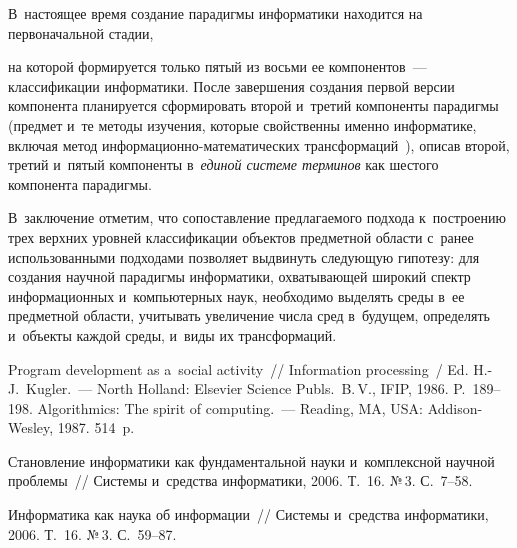 \begin{multicols}{2}
  В~настоящее время создание парадигмы информатики находится на 
первоначальной стадии,\linebreak\vspace*{-12pt}

\pagebreak

\noindent
 на которой формируется только пятый из восьми ее 
компонентов~--- классификации информатики. После завершения создания 
первой версии компонента планируется сформировать второй и~третий 
компоненты парадигмы (предмет и~те методы изучения, которые свойственны 
именно информатике, включая метод  
ин\-фор\-ма\-ци\-он\-но-ма\-те\-ма\-ти\-че\-ских трансформаций~\cite{32-zac}), 
описав второй, третий и~пятый компоненты в~\textit{единой системе 
терминов} как шестого компонента парадигмы.
  
  
  В~заключение отметим, что сопоставление предлагаемого подхода 
к~построению трех верхних уровней классификации объектов предметной 
области с~ранее использованными подходами позволяет выдвинуть  
сле\-ду\-ющую гипотезу: для создания научной парадигмы информатики, 
охватывающей широкий спектр информационных и~компьютерных наук, 
необходимо выделять среды в~ее предметной области, учитывать увеличение 
числа сред в~будущем, определять и~объекты каждой среды, и~виды их 
трансформаций.

\vspace*{-6pt}
  
{\small\frenchspacing
 {\baselineskip=10.6pt
 \begin{thebibliography}{99}
 
 \vspace*{-3pt}
 
 Program development as a~social activity~// Information processing~/ Ed. H.-J.~Kugler.~--- North Holland: Elsevier 
Science Publs.\ B.\,V., IFIP, 1986. P.~189--198.
 Algorithmics: The spirit of computing.~--- Reading, MA, USA: Addison-Wesley, 
1987. 514~p.

 Становление информатики как фундаментальной науки и~комплексной 
научной проблемы~// Сис\-те\-мы и~средства информатики, 2006. Т.~16. №\,3. С.~7--58.

 Информатика как наука об информации~// Системы и~средства 
информатики, 2006. Т.~16. №\,3.  
С.~59--87.


\end{thebibliography}}}
\end{multicols}
